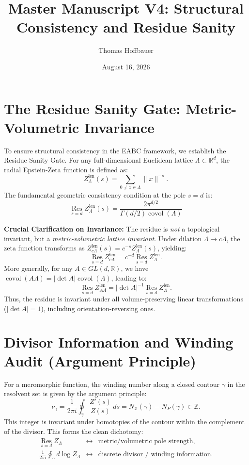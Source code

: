 \documentclass{article}
\title{Master Manuscript V4: Structural Consistency and Residue Sanity}
\author{Thomas Hoffbauer}
\date{August 16, 2026}
\begin{document}
\maketitle

\section{The Residue Sanity Gate: Metric-Volumetric Invariance}

To ensure structural consistency in the EABC framework, we establish the Residue Sanity Gate. For any full-dimensional Euclidean lattice $\Lambda \subset \mathbb{R}^d$, the radial Epstein-Zeta function is defined as:
\[
Z_{\Lambda}^{\mathrm{len}}(s) = \sum_{0 \neq x \in \Lambda} \|x\|^{-s}.
\]
The fundamental geometric consistency condition at the pole $s=d$ is:
\begin{equation}
\boxed{\operatorname*{Res}_{s=d} Z_{\Lambda}^{\mathrm{len}}(s) = \frac{2\pi^{d/2}}{\Gamma(d/2)\operatorname{covol}(\Lambda)}}
\end{equation}

\noindent\textbf{Crucial Clarification on Invariance:} 
The residue is \emph{not} a topological invariant, but a \emph{metric-volumetric lattice invariant}. Under dilation $\Lambda \mapsto c\Lambda$, the zeta function transforms as $Z_{c\Lambda}^{\mathrm{len}}(s) = c^{-s}Z_\Lambda^{\mathrm{len}}(s)$, yielding:
\[
\operatorname*{Res}_{s=d} Z_{c\Lambda}^{\mathrm{len}} = c^{-d} \operatorname*{Res}_{s=d} Z_\Lambda^{\mathrm{len}}.
\]
More generally, for any $A \in GL(d, \mathbb{R})$, we have $\operatorname{covol}(A\Lambda) = |\det A|\operatorname{covol}(\Lambda)$, leading to:
\[
\boxed{
\operatorname*{Res}_{s=d} Z_{A\Lambda}^{\mathrm{len}} = |\det A|^{-1} \operatorname*{Res}_{s=d} Z_\Lambda^{\mathrm{len}}.
}
\]
Thus, the residue is invariant under all volume-preserving linear transformations ($|\det A| = 1$), including orientation-reversing ones.

\section{Divisor Information and Winding Audit (Argument Principle)}

For a meromorphic function, the winding number along a closed contour $\gamma$ in the resolvent set is given by the argument principle:
\[
\nu_\gamma = \frac{1}{2\pi i} \oint_\gamma \frac{Z'(s)}{Z(s)}\,ds = N_Z(\gamma) - N_P(\gamma) \in \mathbb{Z}.
\]
This integer is invariant under homotopies of the contour within the complement of the divisor. This forms the clean dichotomy:
\[
\begin{array}{rcl}
\operatorname*{Res}_{s=d} Z_\Lambda &\longleftrightarrow& \text{metric/volumetric pole strength}, \\[2mm]
\displaystyle \frac{1}{2\pi i}\oint_\gamma d\log Z_\Lambda &\longleftrightarrow& \text{discrete divisor / winding information}.
\end{array}
\]
\end{document}
